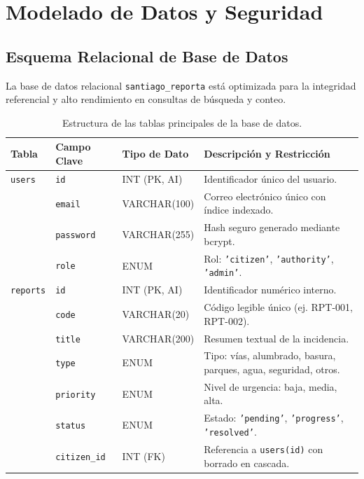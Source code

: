 \documentclass[12pt,a4paper]{article}
\begin{document}
\section{Modelado de Datos y Seguridad}

\subsection{Esquema Relacional de Base de Datos}
La base de datos relacional \texttt{santiago\_reporta} está optimizada para la integridad referencial y alto rendimiento en consultas de búsqueda y conteo.

\begin{table}[H]
\centering
\small
\caption{Estructura de las tablas principales de la base de datos.}
\label{tab:tablas_bd}
\begin{tabular}{lllp{6.5cm}}
\toprule
\textbf{Tabla} & \textbf{Campo Clave} & \textbf{Tipo de Dato} & \textbf{Descripción y Restricción} \\
\midrule
\texttt{users} & \texttt{id} & INT (PK, AI) & Identificador único del usuario. \\
 & \texttt{email} & VARCHAR(100) & Correo electrónico único con índice indexado. \\
 & \texttt{password} & VARCHAR(255) & Hash seguro generado mediante bcrypt. \\
 & \texttt{role} & ENUM & Rol: \texttt{'citizen'}, \texttt{'authority'}, \texttt{'admin'}. \\
\midrule
\texttt{reports} & \texttt{id} & INT (PK, AI) & Identificador numérico interno. \\
 & \texttt{code} & VARCHAR(20) & Código legible único (ej. RPT-001, RPT-002). \\
 & \texttt{title} & VARCHAR(200) & Resumen textual de la incidencia. \\
 & \texttt{type} & ENUM & Tipo: vías, alumbrado, basura, parques, agua, seguridad, otros. \\
 & \texttt{priority} & ENUM & Nivel de urgencia: baja, media, alta. \\
 & \texttt{status} & ENUM & Estado: \texttt{'pending'}, \texttt{'progress'}, \texttt{'resolved'}. \\
 & \texttt{citizen\_id} & INT (FK) & Referencia a \texttt{users(id)} con borrado en cascada. \\

\end{tabular}
\end{table}
\end{document}
